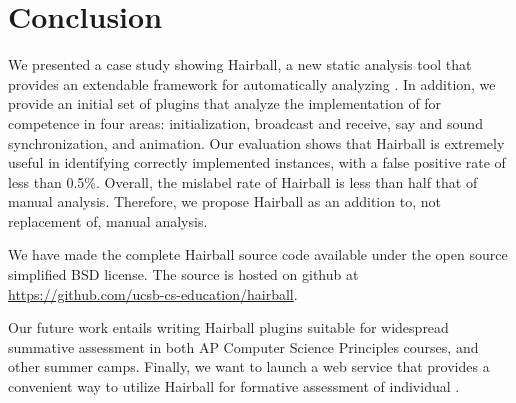 \section{Conclusion} 

We presented a case study showing Hairball, a new static analysis tool that
provides an extendable framework for automatically analyzing .  In
addition, we provide an initial set of plugins that analyze the implementation
of  for competence in four areas: initialization, broadcast and
receive, say and sound synchronization, and animation.  Our evaluation shows
that Hairball is extremely useful in identifying correctly implemented
instances, with a false positive rate of less than 0.5\%.  Overall, the
mislabel rate of Hairball is less than half that of manual analysis.
Therefore, we propose Hairball as an addition to, not replacement of, manual
analysis.

We have made the complete Hairball source code available under the open source
simplified BSD license. The source is hosted on github at\\
\url{https://github.com/ucsb-cs-education/hairball}.

Our future work entails writing Hairball plugins suitable for wide\-spread
summative assessment in both AP Computer Science Principles courses, and other
summer camps. Finally, we want to launch a web service that provides a
convenient way to utilize Hairball for formative assessment of individual
.
